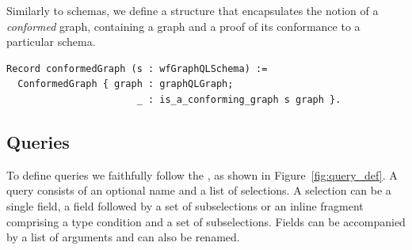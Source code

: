 Similarly to \gql schemas, we define a structure that encapsulates the notion of a \textit{conformed} graph, containing a graph and a proof of its conformance to a particular schema.

\begin{verbatim}
Record conformedGraph (s : wfGraphQLSchema) :=
  ConformedGraph { graph : graphQLGraph;
                       _ : is_a_conforming_graph s graph }.
\end{verbatim}




\subsection{Queries}\label{subsec:query}
To define queries we faithfully follow the \spec, as shown in Figure~\ref{fig:query_def}. A query consists of an optional name and a list of selections. A selection can be a single field, a field followed by a set of subselections or an inline fragment comprising a type condition and a set of subselections. Fields can be accompanied by a list of arguments and can also be renamed.

